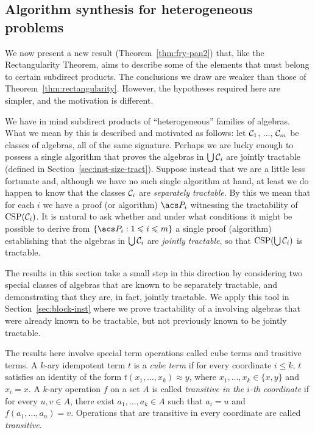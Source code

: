 \subsection{Algorithm synthesis for heterogeneous problems}
\label{sec:heter-potat}
We now present a new result (Theorem~\ref{thm:fry-pan2})
that, like the Rectangularity Theorem, aims to describe some of the elements that
must belong to certain subdirect products.
The conclusions we draw are weaker than those of
Theorem~\ref{thm:rectangularity}.
However, the hypotheses required here are simpler, and the motivation
is different.

We have in mind subdirect products of ``heterogeneous'' 
families of algebras. What we mean by this is 
described and motivated as follows:
let $\mathcal{C}_1$, $\dots$, $\mathcal{C}_m$
be classes of algebras, all of the same signature. Perhaps we are lucky enough
to possess a single algorithm that
proves the algebras in $\bigcup\mathcal{C}_i$ are jointly
tractable (defined in Section~\ref{sec:inst-size-tract}).
Suppose instead that we are a little less fortunate
and, although we have no such single
algorithm at hand, at least we do happen to know that
the classes $\mathcal{C}_i$ are \emph{separately tractable}.
By this we mean that for each $i$ we have a 
proof (or algorithm) $\P_i$ witnessing the tractability of
$\operatorname{CSP}(\mathcal{C}_i)$.
It is natural to ask whether and under what conditions it might be possible to
derive from $\{\P_i : 1\leq i \leq m\}$ a single proof (algorithm)
establishing that the algebras in 
$\bigcup \mathcal{C}_i$ are \emph{jointly tractable},
so that $\operatorname{CSP}(\bigcup \mathcal{C}_i)$ is tractable.

The results in this section take a small
step in this direction by considering two special
classes of algebras that are known to be separately tractable,
and demonstrating that they are, in fact, jointly tractable.
We apply this tool in Section~\ref{sec:block-inst} where
we prove tractability of a \csp involving algebras that were
already known to be tractable, but not previously known to be jointly tractable.


The results here involve special term operations called
cube terms and trasitive terms.
A $k$-ary idempotent term $t$ is a \emph{cube term}
if for every
coordinate $i \leq k$, $t$ satisfies an identity of the form
$t(x_1, \dots, x_k) \approx y$, where
$x_1,\dots, x_k \in \{x, y\}$ and $x_i = x$.
A $k$-ary operation $f$ on a set $A$ is called
\emph{transitive in the $i$-th coordinate} if for every $u, v \in A$,
there exist $a_1,\dots, a_k \in A$ such that $a_i = u$
and $f(a_1 ,\dots, a_n) = v$. Operations
that are transitive in every coordinate are called \emph{transitive}. 

